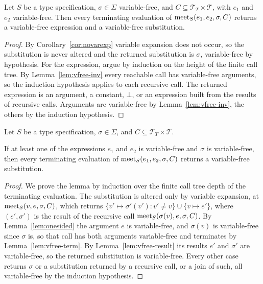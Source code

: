 \documentclass[doc]{subfiles}
\begin{document}
\begin{lemma}\label{lem:vfree-result}
	Let $S$ be a type specification, $\sigma \in \Sigma$ variable-free,
	and $C \subseteq \mathcal{T}_T \times \mathcal{T}$, with $e_1$ and $e_2$ variable-free.
	Then every terminating evaluation of $\mathrm{meet}_S(e_1,e_2,\sigma,C)$
	returns a variable-free expression and a variable-free substitution.
\end{lemma}
\begin{proof}
	By Corollary~\ref{cor:novarexp} variable expansion does not occur, so the substitution
	is never altered and the returned substitution is $\sigma$, variable-free by hypothesis.
	For the expression, argue by induction on the height of the finite call tree.
	By Lemma~\ref{lem:vfree-inv} every reachable call has variable-free arguments,
	so the induction hypothesis applies to each recursive call.
	The returned expression is an argument, a constant, $\bot$, or an expression built from
	the results of recursive calls. Arguments are variable-free by Lemma~\ref{lem:vfree-inv},
	the others by the induction hypothesis.
\end{proof}

\begin{lemma}\label{lem:subreturn}
	Let $S$ be a type specification, $\sigma \in \Sigma$, and $C \subseteq \mathcal{T}_T \times \mathcal{T}$.

	If at least one of the expressions $e_1$ and $e_2$ is variable-free and
	$\sigma$ is variable-free, then every terminating evaluation of
	$\mathrm{meet}_S(e_1,e_2,\sigma,C)$ returns a variable-free substitution.
\end{lemma}

\begin{proof}
	We prove the lemma by induction over the finite call tree depth
	of the terminating evaluation.
	The substitution is altered only by variable expansion, at $\mathrm{meet}_S(v,e,\sigma,C)$,
	which returns $\{v' \mapsto \sigma'(v') : v' \neq v\} \cup \{v \mapsto e'\}$,
	where $(e',\sigma')$ is the result of the recursive call $\mathrm{meet}_S(\sigma(v),e,\sigma,C)$.
	By Lemma~\ref{lem:onesided} the argument $e$ is variable-free, and $\sigma(v)$ is variable-free
	since $\sigma$ is, so that call has both arguments variable-free and terminates by
	Lemma~\ref{lem:vfree-term}. By Lemma~\ref{lem:vfree-result} its results $e'$ and $\sigma'$ are variable-free,
	so the returned substitution is variable-free.
	Every other case returns $\sigma$ or a substitution returned by a recursive call,
	or a join of such, all variable-free by the induction hypothesis.
\end{proof}
\end{document}
